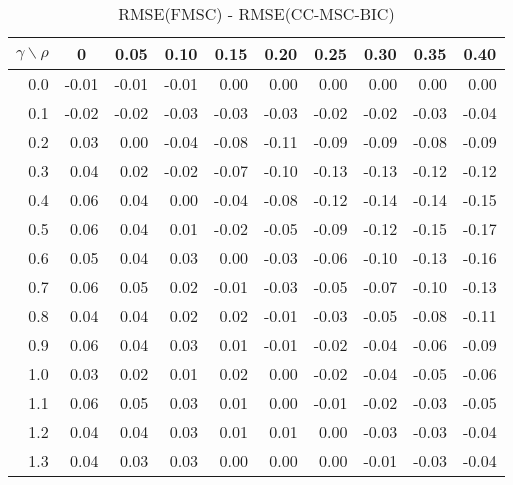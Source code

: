 \documentclass[12pt]{article}
\begin{document}
%
\begin{table}[!tbp]
\caption{RMSE(FMSC) - RMSE(CC-MSC-BIC)}
 \begin{center}
 \begin{tabular}{r|rrrrrrrrr}\hline\hline
\multicolumn{1}{c|}{$\gamma\backslash\rho$}&\multicolumn{1}{c}{0}&\multicolumn{1}{c}{0.05}&\multicolumn{1}{c}{0.10}&\multicolumn{1}{c}{0.15}&\multicolumn{1}{c}{0.20}&\multicolumn{1}{c}{0.25}&\multicolumn{1}{c}{0.30}&\multicolumn{1}{c}{0.35}&\multicolumn{1}{c}{0.40}\tabularnewline
\hline
0.0&-0.01&-0.01&-0.01& 0.00& 0.00& 0.00& 0.00& 0.00& 0.00\tabularnewline
0.1&-0.02&-0.02&-0.03&-0.03&-0.03&-0.02&-0.02&-0.03&-0.04\tabularnewline
0.2& 0.03& 0.00&-0.04&-0.08&-0.11&-0.09&-0.09&-0.08&-0.09\tabularnewline
0.3& 0.04& 0.02&-0.02&-0.07&-0.10&-0.13&-0.13&-0.12&-0.12\tabularnewline
0.4& 0.06& 0.04& 0.00&-0.04&-0.08&-0.12&-0.14&-0.14&-0.15\tabularnewline
0.5& 0.06& 0.04& 0.01&-0.02&-0.05&-0.09&-0.12&-0.15&-0.17\tabularnewline
0.6& 0.05& 0.04& 0.03& 0.00&-0.03&-0.06&-0.10&-0.13&-0.16\tabularnewline
0.7& 0.06& 0.05& 0.02&-0.01&-0.03&-0.05&-0.07&-0.10&-0.13\tabularnewline
0.8& 0.04& 0.04& 0.02& 0.02&-0.01&-0.03&-0.05&-0.08&-0.11\tabularnewline
0.9& 0.06& 0.04& 0.03& 0.01&-0.01&-0.02&-0.04&-0.06&-0.09\tabularnewline
1.0& 0.03& 0.02& 0.01& 0.02& 0.00&-0.02&-0.04&-0.05&-0.06\tabularnewline
1.1& 0.06& 0.05& 0.03& 0.01& 0.00&-0.01&-0.02&-0.03&-0.05\tabularnewline
1.2& 0.04& 0.04& 0.03& 0.01& 0.01& 0.00&-0.03&-0.03&-0.04\tabularnewline
1.3& 0.04& 0.03& 0.03& 0.00& 0.00& 0.00&-0.01&-0.03&-0.04\tabularnewline
\hline
\end{tabular}

\end{center}

\end{table}
\end{document}
